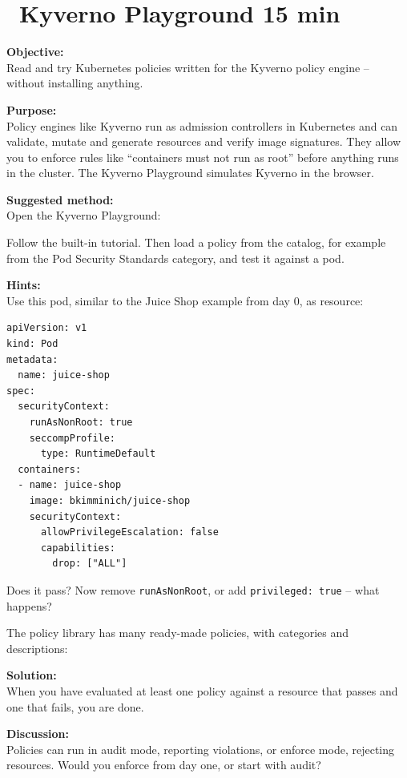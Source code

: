 \documentclass[a4paper,11pt,notitlepage]{report}
\begin{document}
\chapter{\faExclamationTriangle\ Kyverno Playground 15 min}
\label{ex:kyverno-playground}

{\bf Objective:}\\
Read and try Kubernetes policies written for the Kyverno policy engine -- without installing anything.

{\bf Purpose:}\\
Policy engines like Kyverno run as admission controllers in Kubernetes and can validate, mutate and generate resources and verify image signatures. They allow you to enforce rules like ``containers must not run as root'' before anything runs in the cluster. The Kyverno Playground simulates Kyverno in the browser.

{\bf Suggested method:}\\
Open the Kyverno Playground:\\

Follow the built-in tutorial. Then load a policy from the catalog, for example from the Pod Security Standards category, and test it against a pod.

{\bf Hints:}\\
Use this pod, similar to the Juice Shop example from day 0, as resource:
\begin{verbatim}
apiVersion: v1
kind: Pod
metadata:
  name: juice-shop
spec:
  securityContext:
    runAsNonRoot: true
    seccompProfile:
      type: RuntimeDefault
  containers:
  - name: juice-shop
    image: bkimminich/juice-shop
    securityContext:
      allowPrivilegeEscalation: false
      capabilities:
        drop: ["ALL"]
\end{verbatim}

Does it pass? Now remove \verb+runAsNonRoot+, or add \verb+privileged: true+ -- what happens?

The policy library has many ready-made policies, with categories and descriptions:\\

{\bf Solution:}\\
When you have evaluated at least one policy against a resource that passes and one that fails, you are done.

{\bf Discussion:}\\
Policies can run in audit mode, reporting violations, or enforce mode, rejecting resources. Would you enforce from day one, or start with audit?
\end{document}
